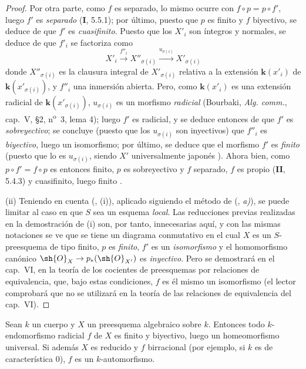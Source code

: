 \begin{proof}
Por otra parte, como $f$ es separado, lo mismo ocurre con
$f\circ p=p\circ f'$, luego $f'$ es \emph{separado} (\textbf I, 5.5.1); por último, puesto que
$p$ es finito y $f$ biyectivo, se deduce de
{} que $f'$ es
\emph{cuasifinito}. Puesto que los $X'_i$ son íntegros y normales, se deduce de
{} que $f'_i$ se factoriza como
\[
 X'_i\xrightarrow{f''_i}X''_{\sigma(i)}
 \xrightarrow{u_{\sigma(i)}}X'_{\sigma(i)}
\]
donde $X''_{\sigma(i)}$ es la clausura integral de
$X'_{\sigma(i)}$ relativa a la extensión $\boldsymbol{k}(x'_i)$ de
$\boldsymbol{k}(x'_{\sigma(i)})$, y $f''_i$ una inmersión abierta. Pero, como
$\boldsymbol{k}(x'_i)$ es una extensión radicial de $\boldsymbol{k}(x'_{\sigma(i)})$,
$u_{\sigma(i)}$ es un morfismo \emph{radicial} (Bourbaki,
\emph{Alg. comm.}, cap.~V, \S2, n\textsuperscript{o}~3, lema 4);
luego $f'$ es radicial, y se deduce entonces de
{} que $f'$ es
\emph{sobreyectivo}; se concluye (puesto que los $u_{\sigma(i)}$ son inyectivos)
que $f''_i$ es \emph{biyectivo}, luego un isomorfismo; por último, se deduce que
el morfismo $f'$ es \emph{finito} (puesto que lo es $u_{\sigma(i)}$,
siendo $X'$ universalmente japonés
{}). Ahora bien, como
$p\circ f'=f\circ p$ es entonces finito, $p$ es sobreyectivo y $f$
separado, $f$ es propio (\textbf{II}, 5.4.3) y cuasifinito, luego finito
{}.

\textup{(ii)} Teniendo en cuenta
({}, (i)), aplicado siguiendo el
método de ({}, \emph{a)}), se puede
limitar al caso en que $S$ sea un esquema \emph{local}. Las reducciones previas
realizadas en la demostración de (i) son, por tanto, innecesarias aquí, y con las mismas
notaciones se ve que se tiene un diagrama conmutativo
{} en el cual $X$ es
un $S$-preesquema de tipo finito, $p$ es \emph{finito}, $f'$ es un \emph{isomorfismo} y
el homomorfismo canónico $\sh{O}_X\to p_*(\sh{O}_{X'})$ es \emph{inyectivo}.
Pero se demostrará en el cap.~VI, en la teoría de los cocientes de
preesquemas por relaciones de equivalencia, que, bajo estas condiciones, $f$
es él mismo un isomorfismo (el lector comprobará que no se utilizará
{} en la teoría de las
relaciones de equivalencia del cap.~VI).
\end{proof}

\begin{corollary}[10.4.13]
\label{IV.10.4.13}
Sean $k$ un cuerpo y $X$ un preesquema algebraico sobre $k$. Entonces todo
$k$-endomorfismo radicial $f$ de $X$ es finito y biyectivo, luego un
homeomorfismo universal. Si además $X$ es reducido y $f$ birracional
\textup{(por ejemplo, si $k$ es de característica 0)}, $f$ es un
$k$-automorfismo.
\end{corollary}

